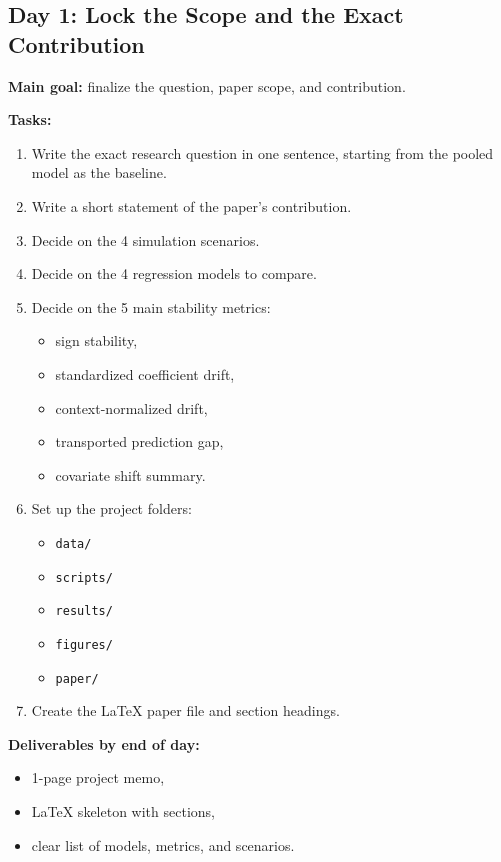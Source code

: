 \documentclass[11pt]{article}
\begin{document}
\subsection*{Day 1: Lock the Scope and the Exact Contribution}
\textbf{Main goal:} finalize the question, paper scope, and contribution.

\textbf{Tasks:}
\begin{enumerate}[label=(\arabic*)]
    \item Write the exact research question in one sentence, starting from the pooled model as the baseline.
    \item Write a short statement of the paper's contribution.
    \item Decide on the 4 simulation scenarios.
    \item Decide on the 4 regression models to compare.
    \item Decide on the 5 main stability metrics:
    \begin{itemize}
        \item sign stability,
        \item standardized coefficient drift,
        \item context-normalized drift,
        \item transported prediction gap,
        \item covariate shift summary.
    \end{itemize}
    \item Set up the project folders:
    \begin{itemize}
        \item \texttt{data/}
        \item \texttt{scripts/}
        \item \texttt{results/}
        \item \texttt{figures/}
        \item \texttt{paper/}
    \end{itemize}
    \item Create the LaTeX paper file and section headings.
\end{enumerate}

\textbf{Deliverables by end of day:}
\begin{itemize}
    \item 1-page project memo,
    \item LaTeX skeleton with sections,
    \item clear list of models, metrics, and scenarios.
\end{itemize}
\end{document}
